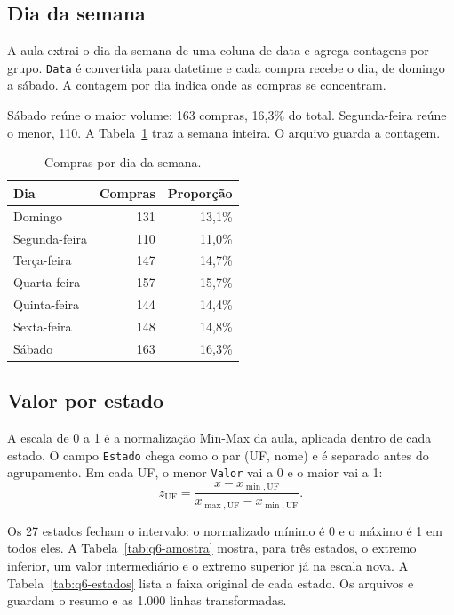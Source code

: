 \subsection{Dia da semana}

A aula extrai o dia da semana de uma coluna de data e agrega contagens por grupo. \texttt{Data} é convertida para datetime e cada compra recebe o dia, de domingo a sábado. A contagem por dia indica onde as compras se concentram.

Sábado reúne o maior volume: 163 compras, 16,3\% do total. Segunda-feira reúne o menor, 110. A Tabela~\ref{tab:q6-dias} traz a semana inteira. O arquivo  guarda a contagem.

\begin{table}[H]
    \centering
    \caption{Compras por dia da semana.}
    \label{tab:q6-dias}
    \footnotesize
    \setlength{\tabcolsep}{10pt}
    \begin{tabular}{@{}lrr@{}}
        \toprule
        Dia & Compras & Proporção \\
        \midrule
        Domingo       & 131 & 13,1\% \\
        Segunda-feira & 110 & 11,0\% \\
        Terça-feira   & 147 & 14,7\% \\
        Quarta-feira  & 157 & 15,7\% \\
        Quinta-feira  & 144 & 14,4\% \\
        Sexta-feira   & 148 & 14,8\% \\
        Sábado        & 163 & 16,3\% \\
        \bottomrule
    \end{tabular}
\end{table}

\subsection{Valor por estado}

A escala de 0 a 1 é a normalização Min-Max da aula, aplicada dentro de cada estado. O campo \texttt{Estado} chega como o par (UF, nome) e é separado antes do agrupamento. Em cada UF, o menor \texttt{Valor} vai a 0 e o maior vai a 1:
\[
z_{\mathrm{UF}} = \frac{x - x_{\min,\mathrm{UF}}}{x_{\max,\mathrm{UF}} - x_{\min,\mathrm{UF}}}.
\]

Os 27 estados fecham o intervalo: o normalizado mínimo é 0 e o máximo é 1 em todos eles. A Tabela~\ref{tab:q6-amostra} mostra, para três estados, o extremo inferior, um valor intermediário e o extremo superior já na escala nova. A Tabela~\ref{tab:q6-estados} lista a faixa original de cada estado. Os arquivos  e  guardam o resumo e as 1.000 linhas transformadas.

